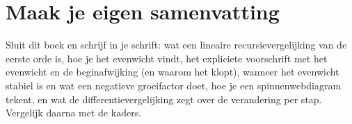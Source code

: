 
\ifzelfstudie
\section*{Maak je eigen samenvatting}
Sluit dit boek en schrijf in je schrift: wat een lineaire recursievergelijking van de eerste orde is, hoe je het evenwicht vindt, het expliciete voorschrift met het evenwicht en de beginafwijking (en waarom het klopt), wanneer het evenwicht stabiel is en wat een negatieve groeifactor doet, hoe je een spinnenwebdiagram tekent, en wat de differentievergelijking zegt over de verandering per stap. Vergelijk daarna met de kaders.
\fi
